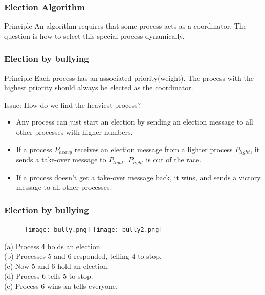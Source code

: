 \begin{frame}
    \frametitle{Election Algorithm}
\begin{block}{Principle}
    An algorithm requires that some process acts as a coordinator. The question is how to select this special process dynamically.
\end{block}

\end{frame}

\begin{frame}
    \frametitle{Election by bullying}
\begin{block}{Principle}
    Each process has an associated priority(weight). The process with the highest priority should always be elected as the coordinator.
\end{block}

\begin{block}{Issue: How do we find the heaviest process?}
    \begin{itemize}
        \item Any process can just start an election by sending an election message to all other processes with higher numbers.
        \item If a process $P_{heavy}$ receives an election message from a lighter process $P_{light}$, it sends a take-over message to $P_{light}$. $P_{light}$ is out of the race.
        \item If a process doesn't get a take-over message back, it wins, and sends a victory message to all other processes.
    \end{itemize}
\end{block}

\end{frame}

\begin{frame}
    \frametitle{Election by bullying}
    \begin{figure}
        \centering
        \texttt{[image: bully.png]}
        \texttt{[image: bully2.png]}
    \end{figure}
(a) Process 4 holds an election. \\
(b) Processes 5 and 6 responded, telling 4 to stop. \\
(c) Now 5 and 6 hold an election. \\
(d) Process 6 tells 5 to stop. \\
(e) Process 6 wins an tells everyone.
\end{frame}


